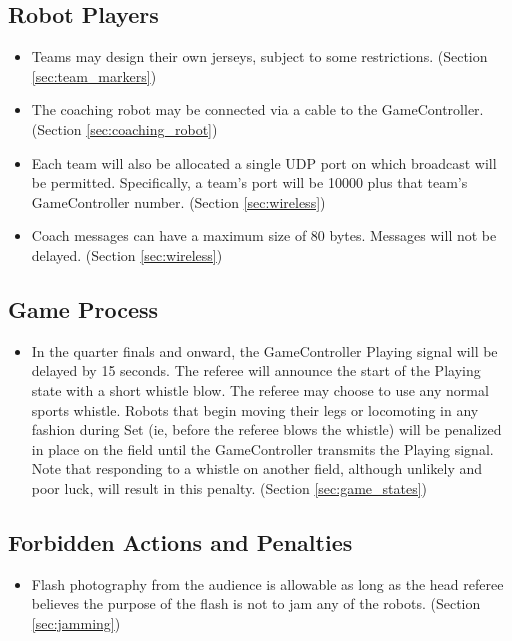 \documentclass[12pt]{article}
\begin{document}
\subsection*{Robot Players}
\begin{itemize}
	\item Teams may design their own jerseys, subject to some restrictions. (Section \ref{sec:team_markers})
	\item The coaching robot may be connected via a cable to the GameController. (Section \ref{sec:coaching_robot})
	\item Each team will also be allocated a single UDP port on which broadcast will be permitted.  Specifically, a team's port will be 10000 plus that team's GameController number. (Section \ref{sec:wireless})
	\item Coach messages can have a maximum size of 80 bytes.  Messages will not be delayed. (Section \ref{sec:wireless})
\end{itemize}

\subsection*{Game Process}
\begin{itemize}
	\item In the quarter finals and onward, the GameController Playing signal will be delayed by 15 seconds.  The referee will announce the start of the Playing state with a short whistle blow.  The referee may choose to use any normal sports whistle.  Robots that begin moving their legs or locomoting in any fashion during Set (ie, before the referee blows the whistle) will be penalized in place on the field until the GameController transmits the Playing signal.  Note that responding to a whistle on another field, although unlikely and poor luck, will result in this penalty. (Section \ref{sec:game_states})
\end{itemize}

\subsection*{Forbidden Actions and Penalties}
\begin{itemize}
	\item Flash photography from the audience is allowable as long as the head referee believes the purpose of the flash is not to jam any of the robots. (Section \ref{sec:jamming})
\end{itemize}
\end{document}
